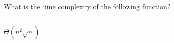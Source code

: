 \begin{prob}
    What is the time complexity of the following function?

    \inputminted{python}{./code.py}

    \begin{soln}
        $\Theta(n^2 \sqrt n)$
    \end{soln}

\end{prob}

